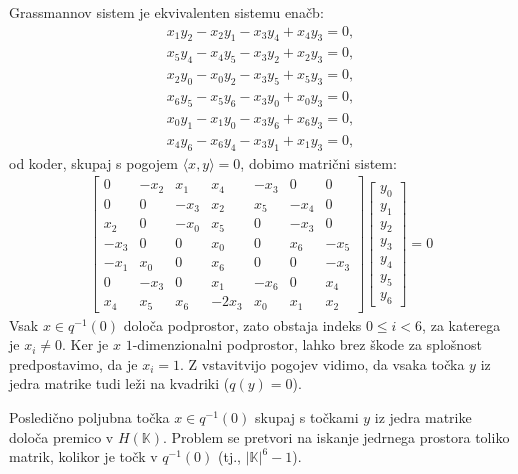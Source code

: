 \documentclass[fin1, tisk]{fmfdelo}
\begin{document}
\begin{opomba}
    Grassmannov sistem je ekvivalenten sistemu enačb:
    \begin{align*}
        x_1y_2 - x_2y_1 - x_3y_4 + x_4y_3 = 0, \\ %
        x_5y_4 - x_4y_5 - x_3y_2 + x_2y_3 = 0, \\ %
        x_2y_0 - x_0y_2 - x_3y_5 + x_5y_3 = 0, \\ %
        x_6y_5 - x_5y_6 - x_3y_0 + x_0y_3 = 0, \\%
        x_0y_1 - x_1y_0 - x_3y_6 + x_6y_3 = 0, \\ %
        x_4y_6 - x_6y_4 - x_3y_1 + x_1y_3 = 0,
    \end{align*}
    od koder, skupaj s pogojem $\langle x, y\rangle = 0$, dobimo matrični sistem:
    \begin{align*}
        \begin{bmatrix}
            0    &-x_2 & x_1 & x_4 &-x_3 & 0   & 0   \\%
            0    & 0   &-x_3 & x_2 & x_5 &-x_4 & 0   \\%
             x_2 & 0   &-x_0 & x_5 & 0   &-x_3 & 0   \\%
            -x_3 & 0   & 0   & x_0 & 0   & x_6 &-x_5 \\%
            -x_1 & x_0 & 0   & x_6 & 0   & 0   &-x_3 \\%
            0    &-x_3 & 0   & x_1 &-x_6 & 0   &x_4 \\
            x_4  & x_5 & x_6 &-2x_3& x_0 & x_1 & x_2
        \end{bmatrix}
        \begin{bmatrix}
            y_0 \\ y_1 \\ y_2 \\ y_3 \\ y_4 \\ y_5 \\ y_6
        \end{bmatrix} = 
        0
    \end{align*}
    Vsak $x\in q^{-1}(0)$ določa podprostor, zato obstaja indeks $0\leq i < 6$, za katerega je $x_i \neq 0$. Ker je
    $x$ $1$-dimenzionalni podprostor, lahko brez škode za splošnost predpostavimo, da je $x_i = 1$.
    Z vstavitvijo pogojev vidimo, da vsaka točka $y$ iz jedra matrike tudi leži na kvadriki ($q(y) = 0$).

    Posledično poljubna točka $x\in q^{-1}(0)$ skupaj s točkami $y$ iz jedra matrike določa premico v $H(\mathbb{K})$.
    Problem se pretvori na iskanje jedrnega prostora toliko matrik, kolikor je točk v $q^{-1}(0)$ (tj., $|\mathbb{K}|^6 - 1$). 
\end{opomba}
\end{document}

